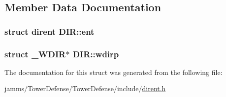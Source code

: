 \subsection{Member Data Documentation}
\hypertarget{struct_d_i_r_a59e9f5211cbb2f8e5b2807ccfdd2a7fc}{
\subsubsection[{ent}]{\setlength{\rightskip}{0pt plus 5cm}struct {\bf dirent} D\+I\+R\+::ent}}\label{struct_d_i_r_a59e9f5211cbb2f8e5b2807ccfdd2a7fc}
\hypertarget{struct_d_i_r_a29362d4a3d7f809d0f5418b26cac5d41}{
\subsubsection[{wdirp}]{\setlength{\rightskip}{0pt plus 5cm}struct {\bf \+\_\+\+W\+D\+I\+R}$\ast$ D\+I\+R\+::wdirp}}\label{struct_d_i_r_a29362d4a3d7f809d0f5418b26cac5d41}


The documentation for this struct was generated from the following file\+:\begin{DoxyCompactItemize}
\item 
jamms/\+Tower\+Defense/\+Tower\+Defense/include/\hyperlink{dirent_8h}{dirent.\+h}\end{DoxyCompactItemize}
